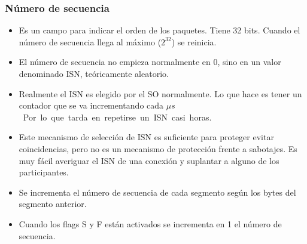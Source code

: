 \subsubsection{Número de secuencia}
\begin{itemize}
    \item Es un campo para indicar el orden de los paquetes. Tiene 32 bits. Cuando el número de secuencia llega al máximo ($2^{32}$) se reinicia.
    \item El número de secuencia no empieza normalmente en 0, sino en un valor denominado \acrfull{ISN}, teóricamente aleatorio.
    \item Realmente el ISN es elegido por el SO normalmente. Lo que hace es tener un contador que se va incrementando cada \unit[4]{$\mu s$}. Por lo que tarda en repetirse un ISN casi \unit[5]{horas}.
    \item Este mecanismo de selección de ISN es suficiente para proteger evitar coincidencias, pero no es un mecanismo de protección frente a sabotajes. Es muy fácil averiguar el ISN de una conexión y suplantar a alguno de los participantes.
    \item Se incrementa el número de secuencia de cada segmento según los bytes del segmento anterior. 
    \item Cuando los flags S y F están activados se incrementa en 1 el número de secuencia.
\end{itemize}

